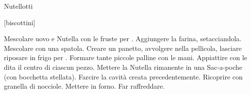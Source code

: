 \begin{recipe}{Nutellotti}
    \begin{header}
        [biscottini]
    
    \end{header}
    
    \begin{ingredients}
        
    \end{ingredients}
    
    \begin{preparation}
        \step Mescolare uovo e Nutella con le fruste per .
        \step Aggiungere la farina, setacciandola. Mescolare con una spatola.
        \step Creare un panetto, avvolgere nella pellicola, lasciare riposare in frigo per .
        \step Formare tante piccole palline con le mani. Appiattire con le dita il centro di ciascun pezzo.
        \step Mettere la Nutella rimanente in una Sac-a-poche (con bocchetta stellata).
        \step Farcire la cavità creata precedentemente.
        \step Ricoprire con granella di nocciole.
        \step Mettere in forno.
        \step Far raffreddare.
    \end{preparation}
\end{recipe}
